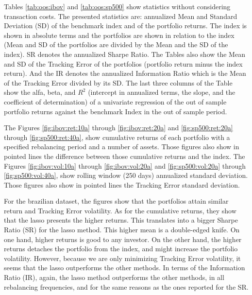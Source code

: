 \documentclass[12pt,oneside,a4paper]{memoir}
\begin{document}

Tables \ref{tab:oos:ibov} and \ref{tab:oos:sp500} show statistics without considering transaction costs.
The presented statistics are: annualized Mean and Standard Deviation (SD) of the benchmark index and of the portfolio returns.
The index is shown in absolute terms and the portfolios are shown in relation to the index (Mean and SD of the portfolios are divided by the Mean and the SD of the index).
SR denotes the annualized Sharpe Ratio.
The Tables also show the Mean and SD of the Tracking Error of the portfolios (portfolio return minus the index return).
And the IR denotes the annualized Information Ratio which is the Mean of the Tracking Error divided by its SD.
The last three columns of the Table show the alfa, beta, and $R^2$ (intercept in annualized terms, the slope, and the coefficient of determination) of a univariate regression of the out of sample portfolio returns against the benchmark Index in the out of sample period.

The Figures \ref{fig:ibov:ret:10a} through \ref{fig:ibov:ret:20a} and \ref{fig:sp500:ret:20a} through \ref{fig:sp500:ret:40a}, show cumulative returns of each portfolio with a specified rebalancing period and a number of assets.
Those figures also show in pointed lines the difference between those cumulative returns and the index.
The Figures \ref{fig:ibov:vol:10a} through \ref{fig:ibov:vol:20a} and \ref{fig:sp500:vol:20a} through \ref{fig:sp500:vol:40a}, show rolling window (250 days) annualized standard deviation.
Those figures also show in pointed lines the Tracking Error standard deviation.

For the brazilian dataset, the figures show that the portfolios attain similar return and Tracking Error volatility.
As for the cumulative returns, they show that the lasso presents the higher returns.
This translates into a bigger Sharpe Ratio (SR) for the lasso method.
This higher mean is a double-edged knife.
On one hand, higher returns is good to any investor.
On the other hand, the higher returns detaches the portfolio from the index, and might increase the portfolio volatility.
However, because we are only minimizing Tracking Error volatility, it seems that the lasso outperforms the other methods.
In terms of the Information Ratio (IR), again, the lasso method outperforms the other methods, in all rebalancing frequencies, and for the same reasons as the ones reported for the SR.
\end{document}
